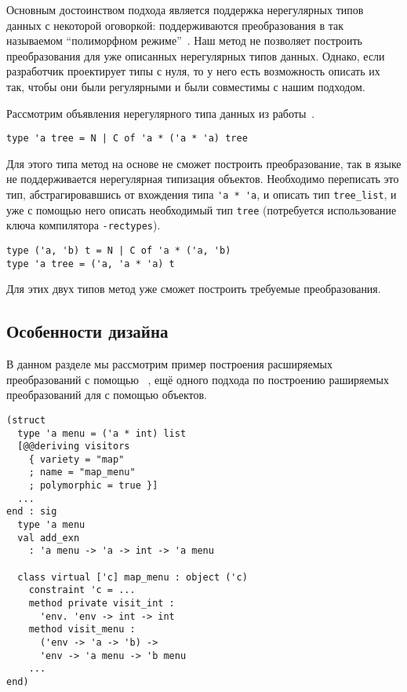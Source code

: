 Основным достоинством подхода \visitors{} является поддержка нерегулярных типов данных с некоторой оговоркой: поддерживаются преобразования в так называемом ``полиморфном режиме''~\cite{Visitors}. Наш метод не позволяет построить преобразования для уже описанных нерегулярных типов данных. Однако, если разработчик проектирует типы с нуля, то у него есть возможность описать их так, чтобы они были регулярными и были совместимы с нашим подходом. 

Рассмотрим объявления нерегулярного типа данных  из работы~\cite{irregular}.

\begin{lstlisting}
type 'a tree = N | C of 'a * ('a * 'a) tree
\end{lstlisting}
\noindent Для этого типа метод на основе \GT{} не сможет построить преобразование, так в языке \ocaml{} не поддерживается нерегулярная типизация объектов. Необходимо переписать это тип, абстрагировавшись от вхождения типа \lstinline{'a * 'a}, и описать тип \lstinline{tree_list}, и уже с помощью него описать  необходимый тип \lstinline{tree} (потребуется использование ключа компилятора \texttt{-rectypes}).
\begin{lstlisting}
type ('a, 'b) t = N | C of 'a * ('a, 'b)
type 'a tree = ('a, 'a * 'a) t 
\end{lstlisting}
\noindent Для этих двух типов метод уже сможет построить требуемые преобразования.

\subsection{Особенности дизайна}
\label{sec:design}

В данном разделе мы рассмотрим пример построения расширяемых преобразований с помощью \visitors~\cite{Visitors}, ещё одного подхода по построению раширяемых преобразований для \OCaml{} с помощью объектов.

\begin{lstlisting}
(struct 
  type 'a menu = ('a * int) list
  [@@deriving visitors 
    { variety = "map"
    ; name = "map_menu"
    ; polymorphic = true }]
  ...
end : sig 
  type 'a menu 
  val add_exn
    : 'a menu -> 'a -> int -> 'a menu
    
  class virtual ['c] map_menu : object ('c)
    constraint 'c = ...
    method private visit_int : 
      'env. 'env -> int -> int
    method visit_menu :
      ('env -> 'a -> 'b) -> 
      'env -> 'a menu -> 'b menu
    ...
end)
\end{lstlisting}

